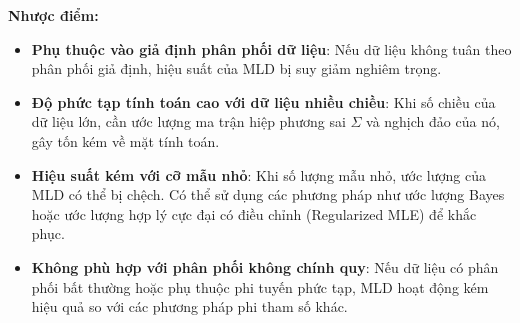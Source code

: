 \textbf{Nhược điểm:}
\begin{itemize}
    \item \textbf{Phụ thuộc vào giả định phân phối dữ liệu}: Nếu dữ liệu không tuân theo phân phối giả định, hiệu suất của MLD bị suy giảm nghiêm trọng.

    \item \textbf{Độ phức tạp tính toán cao với dữ liệu nhiều chiều}: Khi số chiều của dữ liệu lớn, cần ước lượng ma trận hiệp phương sai $\Sigma$ và nghịch đảo của nó, gây tốn kém về mặt tính toán.

    \item \textbf{Hiệu suất kém với cỡ mẫu nhỏ}: Khi số lượng mẫu nhỏ, ước lượng của MLD có thể bị chệch. Có thể sử dụng các phương pháp như ước lượng Bayes hoặc ước lượng hợp lý cực đại có điều chỉnh (Regularized MLE) để khắc phục.

    \item \textbf{Không phù hợp với phân phối không chính quy}: Nếu dữ liệu có phân phối bất thường hoặc phụ thuộc phi tuyến phức tạp, MLD hoạt động kém hiệu quả so với các phương pháp phi tham số khác.
\end{itemize}

